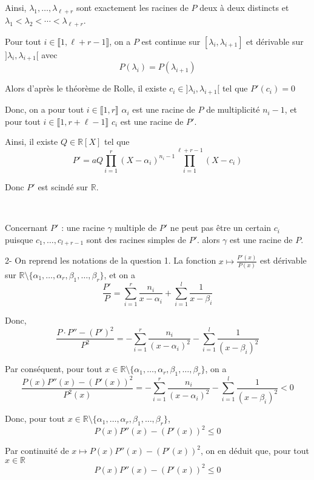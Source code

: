 Ainsi, $\lambda_1, \ldots, \lambda_{\ell + r}$ sont exactement les racines de
$P$ deux {\`a} deux distincts et $\lambda_1 < \lambda_2 < \cdots <
\lambda_{\ell + r}$.

Pour tout $i \in \llbracket 1, \ell + r - 1 \rrbracket$, on a $P$ est continue
sur $[\lambda_i, \lambda_{i + 1}]$ et d{\'e}rivable sur $] \lambda_i,
\lambda_{i + 1} [$ avec
\[ P (\lambda_i) = P (\lambda_{i + 1}) \]


Alors d'apr{\`e}s le th{\'e}or{\`e}me de Rolle, il existe $c_i \in] \lambda_i,
\lambda_{i + 1} [$ tel que $P' (c_i) = 0$

Donc, on a pour tout $i \in \llbracket 1, r \rrbracket$ $\alpha_i$ est une
racine de $P$ de multiplicit{\'e} $n_i - 1$, et pour tout $i \in \llbracket 1,
r + \ell - 1 \rrbracket$ $c_i$ est une racine de $P'$.

Ainsi, il existe $Q \in \mathbb{R}[X]$ tel que
\[ P' = a Q \prod_{i = 1}^r (X - \alpha_i)^{n_i - 1}  \prod_{i = 1}^{\ell + r
   - 1} (X - c_i) \]


Donc $P'$ est scind{\'e} sur $\mathbb{R}$.

\

Concernant $P'$ : une racine $\gamma$ multiple de $P'$ ne peut pas {\^e}tre
un certain $c_i$ puisque $c_1, \ldots, c_{l + r - 1}$ sont des racines simples
de $P'$. alors $\gamma$ est une racine de $P$.

2- On reprend les notations de la question 1. La fonction $x \mapsto \frac{P'
(x)}{P (x)}$ est d{\'e}rivable sur $\mathbb{R} \setminus \{\alpha_1, \ldots,
\alpha_r, \beta_1, \ldots, \beta_r \}$, et on a
\[ \frac{P'}{P} = \sum_{i = 1}^r \frac{n_i}{x - \alpha_i} + \sum_{i = 1}^l
   \frac{1}{x - \beta_i} \]


Donc,
\[ \frac{P \cdot P'' - (P')^2}{P^2} = - \sum_{i = 1}^r \frac{n_i}{(x -
   \alpha_i)^2} - \sum_{i = 1}^l \frac{1}{(x - \beta_i)^2} \]


Par cons{\'e}quent, pour tout $x \in \mathbb{R} \setminus \{\alpha_1, \ldots,
\alpha_r, \beta_1, \ldots, \beta_r \}$, on a
\[ \frac{P (x) P'' (x) - (P' (x))^2}{P^2 (x)} = - \sum_{i = 1}^r \frac{n_i}{(x
   - \alpha_i)^2} - \sum_{i = 1}^l \frac{1}{(x - \beta_i)^2} < 0 \]


Donc, pour tout $x \in \mathbb{R} \setminus \{\alpha_1, \ldots, \alpha_r,
\beta_1, \ldots, \beta_r \}$,
\[ P (x) P'' (x) - (P' (x))^2 \leq 0 \]


Par continuit{\'e} de $x \mapsto P (x) P'' (x) - (P' (x))^2$, on en d{\'e}duit
que, pour tout $x \in \mathbb{R}$
\[ P (x) P'' (x) - (P' (x))^2 \leq 0 \]


